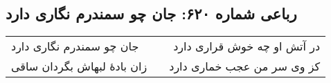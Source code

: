 \begin{center}
\section*{رباعی شماره ۶۲۰: جان چو سمندرم نگاری دارد}
\label{sec:0620}
\begin{longtable}{l p{0.5cm} r}
جان چو سمندرم نگاری دارد
&&
در آتش او چه خوش قراری دارد
\\
زان بادهٔ لبهاش بگردان ساقی
&&
کز وی سر من عجب خماری دارد
\\
\end{longtable}
\end{center}
